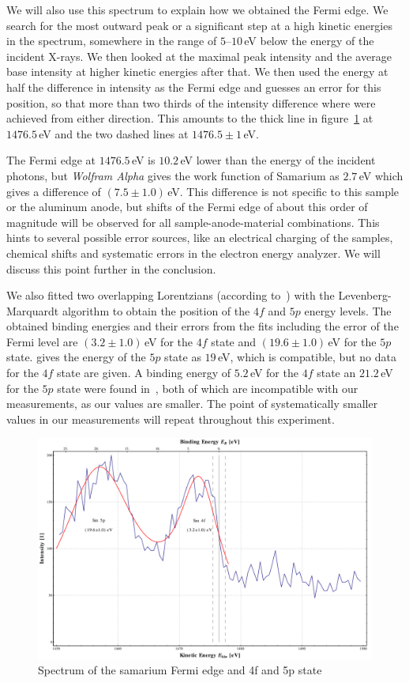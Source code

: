\documentclass[a4paper,10pt]{scrartcl}
\begin{document}
We will also use this spectrum to  explain how we obtained the Fermi edge. We search for the most outward peak or a significant step at a high kinetic energies in the spectrum, somewhere in the range of $5$--$10\,$eV below the energy of the incident X-rays. We then looked at the maximal peak intensity and the average base intensity at higher kinetic energies after that. We then used the energy at half the difference in intensity as the Fermi edge and guesses an error for this position, so that more than two thirds of the intensity difference where were achieved from either direction. This amounts to the thick line in figure~\ref{fig:sm_fermi} at $1476.5\,$eV and the two dashed lines at $1476.5 \pm 1\,$eV.

The Fermi edge at $1476.5\,$eV is  $10.2\,$eV lower than the energy of the incident photons, but \textit{Wolfram Alpha} gives the work function of Samarium  as $2.7\,$eV which gives a difference of $(7.5 \pm 1.0)\,$eV. This difference is not specific to this sample or the aluminum anode, but shifts of the Fermi edge of about this order of magnitude will be observed for all sample-anode-material combinations. This hints to several possible error sources, like an electrical charging of the samples, chemical shifts and systematic errors in the electron energy analyzer. We will discuss this point further in the conclusion.

We also fitted two overlapping Lorentzians (according to~\cite{book}) with the Levenberg-Marquardt algorithm to obtain the position of the $4f$ and $5p$ energy levels. The obtained binding energies and their errors from the fits including the error of the Fermi level are $(3.2 \pm 1.0)\,$eV for the $4f$ state and $(19.6 \pm 1.0)\,$eV for the $5p$ state. \cite{handbook} gives the energy of the $5p$ state as $19\,$eV, which is compatible, but no data for the $4f$ state are given. A  binding energy of $5.2\,$eV for the $4f$ state an $21.2\,$eV for the $5p$ state were found in~\cite{booklet}, both of which are incompatible with our measurements, as our values are smaller. The point of systematically smaller values in our measurements will repeat throughout this experiment.

\begin{figure}
\centering
\includegraphics[scale=0.3]{img/samarium_fermiedge_al}
\caption{Spectrum of the samarium Fermi edge and 4f and 5p state \label{fig:sm_fermi}}
\end{figure}
\end{document}

